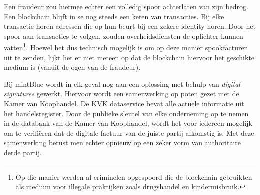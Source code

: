 Een fraudeur zou hiermee echter een volledig spoor achterlaten van zijn bedrog. Een blockchain blijft in se nog steeds een keten van transacties. Bij elke transactie horen adressen die op hun beurt bij een zekere identity horen. Door het spoor aan transacties te volgen, zouden overheidsdiensten de oplichter kunnen vatten\footnote{Op die manier werden al criminelen opgespoord die de blockchain gebruikten als medium voor illegale praktijken zoals drugshandel en kindermisbruik.}. Hoewel het dus technisch mogelijk is om op deze manier spookfacturen uit te zenden, lijkt het er niet meteen op dat de blockchain hiervoor het geschikte medium is (vanuit de ogen van de fraudeur).

Bij mintBlue wordt in elk geval nog aan een oplossing met behulp van \textit{digital signatures} gewerkt. Hiervoor wordt een samenwerking op poten gezet met de Kamer van Koophandel. De KVK dataservice bevat alle actuele informatie uit het handelsregister. Door de publieke sleutel van elke onderneming op te nemen in de databank van de Kamer van Koophandel, wordt het voor iedereen mogelijk om te verifiëren dat de digitale factuur van de juiste partij afkomstig is. Met deze samenwerking berust men echter opnieuw op een zeker vorm van authoritaire derde partij. 




